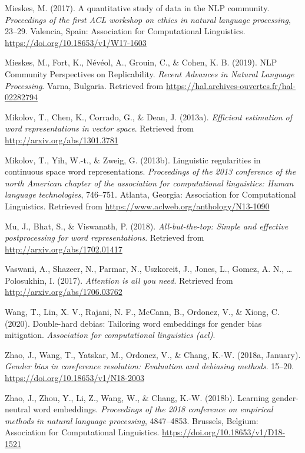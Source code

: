 \documentclass[
  english,
  man,floatsintext]{apa6}
\begin{document}
\leavevmode\hypertarget{ref-mieskes_2017}{}%
Mieskes, M. (2017). A quantitative study of data in the NLP community. \emph{Proceedings of the first ACL workshop on ethics in natural language processing}, 23--29. Valencia, Spain: Association for Computational Linguistics. \url{https://doi.org/10.18653/v1/W17-1603}

\leavevmode\hypertarget{ref-mieskes_2019}{}%
Mieskes, M., Fort, K., Névéol, A., Grouin, C., \& Cohen, K. B. (2019). NLP Community Perspectives on Replicability. \emph{Recent Advances in Natural Language Processing}. Varna, Bulgaria. Retrieved from \url{https://hal.archives-ouvertes.fr/hal-02282794}

\leavevmode\hypertarget{ref-mikolov2013Google}{}%
Mikolov, T., Chen, K., Corrado, G., \& Dean, J. (2013a). \emph{Efficient estimation of word representations in vector space}. Retrieved from \url{http://arxiv.org/abs/1301.3781}

\leavevmode\hypertarget{ref-mikolov2013MSR}{}%
Mikolov, T., Yih, W.-t., \& Zweig, G. (2013b). Linguistic regularities in continuous space word representations. \emph{Proceedings of the 2013 conference of the north American chapter of the association for computational linguistics: Human language technologies}, 746--751. Atlanta, Georgia: Association for Computational Linguistics. Retrieved from \url{https://www.aclweb.org/anthology/N13-1090}

\leavevmode\hypertarget{ref-mu_2018}{}%
Mu, J., Bhat, S., \& Viswanath, P. (2018). \emph{All-but-the-top: Simple and effective postprocessing for word representations}. Retrieved from \url{http://arxiv.org/abs/1702.01417}

\leavevmode\hypertarget{ref-vaswani_2017}{}%
Vaswani, A., Shazeer, N., Parmar, N., Uszkoreit, J., Jones, L., Gomez, A. N., \ldots{} Polosukhin, I. (2017). \emph{Attention is all you need}. Retrieved from \url{http://arxiv.org/abs/1706.03762}

\leavevmode\hypertarget{ref-wang_2020}{}%
Wang, T., Lin, X. V., Rajani, N. F., McCann, B., Ordonez, V., \& Xiong, C. (2020). Double-hard debias: Tailoring word embeddings for gender bias mitigation. \emph{Association for computational linguistics (acl)}.

\leavevmode\hypertarget{ref-zhao_2018a}{}%
Zhao, J., Wang, T., Yatskar, M., Ordonez, V., \& Chang, K.-W. (2018a, January). \emph{Gender bias in coreference resolution: Evaluation and debiasing methods}. 15--20. \url{https://doi.org/10.18653/v1/N18-2003}

\leavevmode\hypertarget{ref-zhao_2018b}{}%
Zhao, J., Zhou, Y., Li, Z., Wang, W., \& Chang, K.-W. (2018b). Learning gender-neutral word embeddings. \emph{Proceedings of the 2018 conference on empirical methods in natural language processing}, 4847--4853. Brussels, Belgium: Association for Computational Linguistics. \url{https://doi.org/10.18653/v1/D18-1521}

\endgroup
\end{document}

